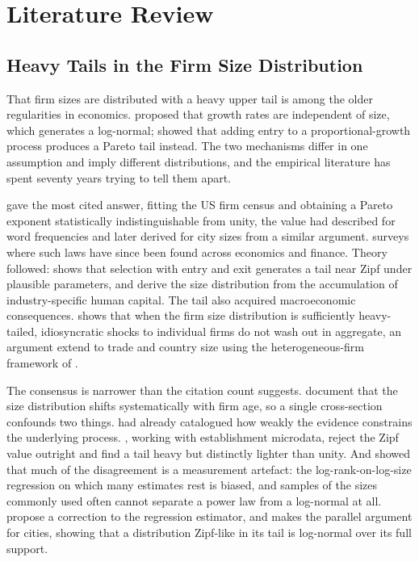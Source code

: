 \documentclass[jrfm,article,submit,pdftex,moreauthors]{Definitions/mdpi}
\begin{document}
\section{Literature Review}
\label{sec:lit}

\subsection{Heavy Tails in the Firm Size Distribution}
\label{subsec:lit_tails}

That firm sizes are distributed with a heavy upper tail is among the older regularities in
economics. \citet{Gibrat1931} proposed that growth rates are independent of size, which
generates a log-normal; \citet{Simon1955} showed that adding entry to a proportional-growth
process produces a Pareto tail instead. The two mechanisms differ in one assumption and
imply different distributions, and the empirical literature has spent seventy years trying
to tell them apart.

\citet{Axtell2001} gave the most cited answer, fitting the US firm census and obtaining a Pareto exponent statistically indistinguishable from unity, the value
\citet{Zipf1949} had described for word frequencies and \citet{Gabaix1999} later derived
for city sizes from a similar argument. \citet{Gabaix2009} surveys where such laws have
since been found across economics and finance. Theory followed:
\citet{Luttmer2007} shows that selection with entry and exit generates a tail near Zipf
under plausible parameters, and \citet{RossiHansbergWright2007} derive the size distribution
from the accumulation of industry-specific human capital. The tail also acquired
macroeconomic consequences. \citet{Gabaix2011} shows that when the firm size distribution is
sufficiently heavy-tailed, idiosyncratic shocks to individual firms do not wash out in
aggregate, an argument \citet{DiGiovanniLevchenko2012} extend to trade and country size using the
heterogeneous-firm framework of \citet{Melitz2003}.

The consensus is narrower than the citation count suggests.
\citet{CabralMata2003} document that the size distribution shifts systematically with firm
age, so a single cross-section confounds two things. \citet{Sutton1997} had already
catalogued how weakly the evidence constrains the underlying process.
\citet{KondoLewisStella2023}, working with establishment microdata, reject the Zipf value
outright and find a tail heavy but distinctly lighter than unity. And
\citet{ClausetShaliziNewman2009} showed that much of the disagreement is a measurement
artefact: the log-rank-on-log-size regression on which many estimates rest is biased, and
samples of the sizes commonly used often cannot separate a power law from a log-normal at
all. \citet{GabaixIbragimov2011} propose a correction to the regression estimator, and
\citet{Eeckhout2004} makes the parallel argument for cities, showing that a distribution
Zipf-like in its tail is log-normal over its full support.
\end{document}
